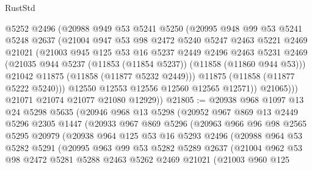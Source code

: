 \begin{lexlean}{RustStd}
\begin{coremodule}
              @5252
              @2496
              (@20988
                @949
                @53
                @5241
                @5250
                (@20995
                  @948
                  @99
                  @53
                  @5241
                  @5248
                  @2637
                  (@21004
                    @947
                    @53
                    @98
                    @2472
                    @5240
                    @5247
                    @2463
                    @5221
                    @2469
                    @21021
                    (@21003
                      @945
                      @125
                      @53
                      @16
                      @5237
                      @2449
                      @2496
                      @2463
                      @5231
                      @2469
                      (@21035 @944 @5237 (@11853 (@11854 @5237)) (@11858 (@11860 @944 @53)))
                      @21042
                      @11875
                      (@11858 (@11877 @5232 @2449)))
                    @11875
                    (@11858 (@11877 @5222 @5240)))
                  @12550
                  @12553
                  @12556
                  @12560
                  @12565
                  @12571))
              @21065)))
        @21071
        @21074
        @21077
        @21080
        @12929))
@21805 := @20938
    @968
    @1097
    @13
    @24
    @5298
    @5635
    (@20946
      @968
      @13
      @5298
      (@20952
        @967
        @869
        @13
        @2449
        @5296
        @2305
        @1447
        (@20933
          @967
          @869
          @5296
          (@20963
            @966
            @96
            @98
            @2565
            @5295
            @20979
            (@20938
              @964
              @125
              @53
              @16
              @5293
              @2496
              (@20988
                @964
                @53
                @5282
                @5291
                (@20995
                  @963
                  @99
                  @53
                  @5282
                  @5289
                  @2637
                  (@21004
                    @962
                    @53
                    @98
                    @2472
                    @5281
                    @5288
                    @2463
                    @5262
                    @2469
                    @21021
                    (@21003
                      @960
                      @125

\end{coremodule}
\end{lexlean}
